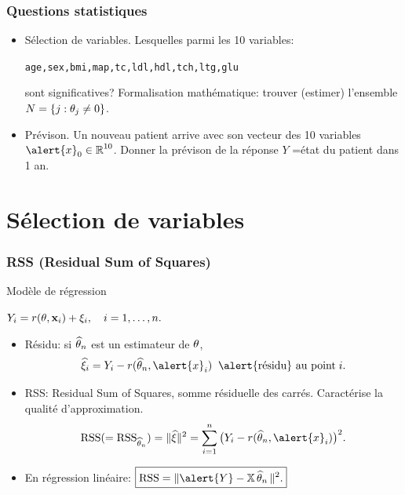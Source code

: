 \begin{frame}
\frametitle{Questions statistiques}
\begin{itemize}
\item \alert{Sélection de variables.} Lesquelles parmi les 10
variables:\\\vspace{3mm}
\centerline{\texttt{age,sex,bmi,map,tc,ldl,hdl,tch,ltg,glu}}\vspace{3mm}
sont significatives? Formalisation mathématique: trouver (estimer)
l'ensemble $N= \{j: \theta_{j}\ne 0\}$.
\item \alert{Prévison.} Un nouveau patient arrive avec son vecteur
des 10 variables $\alert{x}_0\in \R^{10}$. Donner la prévison de la
réponse $Y$ =état du patient dans 1 an.
\end{itemize}
\end{frame}

\section{Sélection de variables}

\begin{frame}
\frametitle{RSS (Residual Sum of Squares)} Modèle de
régression\vspace{2mm} \centerline{$ Y_i= r(\theta, {\bf
x}_i)+\xi_i, \quad i=1,\dots,n.$}
\begin{itemize}
\item \alert{Résidu:} si $\operatorname{\widehat \theta_{\mathnormal{n}}}$ est un estimateur de
$\theta$,
$$\widehat \xi_i = Y_i - r(\est, \alert{x}_i)
\;\;\text{\alert{résidu} au point}\;i.$$
\item \alert{RSS:} \alert{ Residual Sum of Squares}, somme
résiduelle des carrés. Caractérise la qualité
d'approximation.
$${\rm RSS}(={\rm RSS}_{\est})=\|\widehat \xi\|^2
= \sum_{i = 1}^n\big(Y_i - r(\est,\alert{x}_i)\big)^2.$$
\item En régression \alert{linéaire}:
$\boxed{{\rm RSS}= \|\alert{Y}-\regressmat\est\|^2.}$
\end{itemize}
\end{frame}



